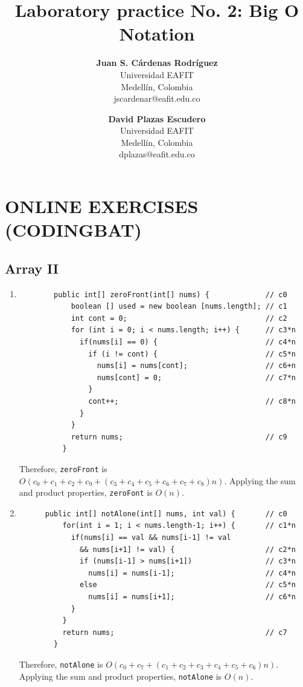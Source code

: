 \documentclass[a4paper,12pt]{article}
\title{\color{Eblue}\textbf{Laboratory practice No. 2: Big O Notation}}
\author{
  \textbf{Juan S. Cárdenas Rodríguez}\\
  Universidad EAFIT\\
  Medellín, Colombia\\
  jscardenar@eafit.edu.co
\and
  \textbf{David Plazas Escudero}\\
  Universidad EAFIT\\
  Medellín, Colombia\\
  dplazas@eafit.edu.co
}
\begin{document}
  \maketitle
  \thispagestyle{fancy}

  \section{ONLINE EXERCISES (CODINGBAT)}
  \subsection{Array II}
    \begin{enumerate}
      \item \begin{Verbatim}
        public int[] zeroFront(int[] nums) {             // c0
            boolean [] used = new boolean [nums.length]; // c1
            int cont = 0;                                // c2
            for (int i = 0; i < nums.length; i++) {      // c3*n
              if(nums[i] == 0) {                         // c4*n
                if (i != cont) {                         // c5*n
                  nums[i] = nums[cont];                  // c6+n
                  nums[cont] = 0;                        // c7*n
                }
                cont++;                                  // c8*n
              }
            }
            return nums;                                 // c9
          }
      \end{Verbatim}
      Therefore, \texttt{zeroFront} is $O(c_0+c_1+c_2+c_9+(c_3+c_4+c_5+c_6+c_7+c_8)n)$.
      Applying the sum and product properties, \texttt{zeroFont} is $O(n)$.

      \item \begin{Verbatim}
      public int[] notAlone(int[] nums, int val) {       // c0
          for(int i = 1; i < nums.length-1; i++) {       // c1*n
            if(nums[i] == val && nums[i-1] != val
              && nums[i+1] != val) {                     // c2*n
              if (nums[i-1] > nums[i+1])                 // c3*n
                nums[i] = nums[i-1];                     // c4*n
              else                                       // c5*n
                nums[i] = nums[i+1];                     // c6*n
            }
          }
          return nums;                                   // c7
        }
    \end{Verbatim}
    Therefore, \texttt{notAlone} is $O(c_0+c_7+(c_1+c_2+c_3+c_4+c_5+c_6)n)$.
    Applying the sum and product properties, \texttt{notAlone} is $O(n)$.


\end{enumerate}
\end{document}
